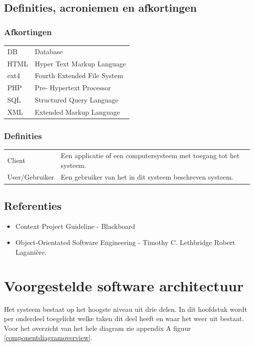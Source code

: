 \documentclass[a4paper,10pt]{article}
\begin{document}
	\subsection{Definities, acroniemen en afkortingen}
		\subsubsection{Afkortingen}
		\begin{tabular}{ l | l }
			DB & Database \\
			HTML & Hyper Text Markup Language \\
			ext4 & Fourth Extended File System \\
			PHP & Pre- Hypertext Processor \\
			SQL & Structured Query Language \\
			XML & Extended Markup Language
		\end{tabular}
	
		\subsubsection{Definities}
		\begin{tabular}{ l | l }
			Client & Een applicatie of een computersysteem met toegang tot het systeem. \\
			User/Gebruiker & Een gebruiker van het in dit systeem beschreven systeem.
		\end{tabular}
		
	\subsection{Referenties}
	\begin{itemize}
		\item Context Project Guideline - Blackboard
		\item Object-Orientated Software Engineering - Timothy C. Lethbridge Robert Lagani\`ere.
	\end{itemize}
	
\section{Voorgestelde software architectuur}
Het systeem bestaat op het hoogste niveau uit drie delen. In dit hoofdstuk wordt per onderdeel toegelicht welke taken dit deel heeft en waar het weer uit bestaat. Voor het overzicht van het hele diagram zie appendix A figuur \ref{componentdiagramoverview}.
\end{document}
